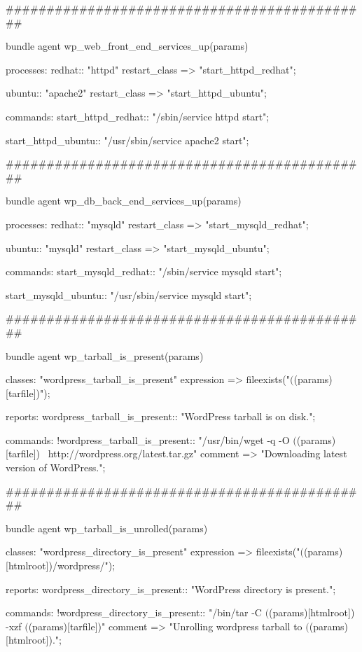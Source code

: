 \begin{codelisting}
\begin{code}
#############################################

bundle agent wp_web_front_end_services_up(params)
{

  processes:
    redhat::
      "httpd"  restart_class => "start_httpd_redhat";

    ubuntu::
      "apache2"  restart_class => "start_httpd_ubuntu";


  commands:
    start_httpd_redhat::
      "/sbin/service httpd start";

    start_httpd_ubuntu::
      "/usr/sbin/service apache2 start";

}

#############################################

bundle agent wp_db_back_end_services_up(params)
{
  processes:
    redhat::
      "mysqld" restart_class => "start_mysqld_redhat";

    ubuntu::
      "mysqld" restart_class => "start_mysqld_ubuntu";


  commands:
    start_mysqld_redhat::
      "/sbin/service mysqld start";

    start_mysqld_ubuntu::
      "/usr/sbin/service mysqld start";


}

#############################################

bundle agent wp_tarball_is_present(params)
{

  classes:
      "wordpress_tarball_is_present"
        expression => fileexists("$($(params)[tarfile])");

  reports:
    wordpress_tarball_is_present::
      "WordPress tarball is on disk.";

  commands:
    !wordpress_tarball_is_present::
      "/usr/bin/wget -q -O $($(params)[tarfile]) \
                     http://wordpress.org/latest.tar.gz"
        comment => "Downloading latest version of WordPress.";
}

#############################################

bundle agent wp_tarball_is_unrolled(params)
{

  classes:
      "wordpress_directory_is_present"
        expression => fileexists("$($(params)[htmlroot])/wordpress/");

  reports:
    wordpress_directory_is_present::
      "WordPress directory is present.";

  commands:
    !wordpress_directory_is_present::
      "/bin/tar -C $($(params)[htmlroot]) -xzf $($(params)[tarfile])"
        comment => "Unrolling wordpress tarball to $($(params)[htmlroot]).";
}



\end{code}
\end{codelisting}
